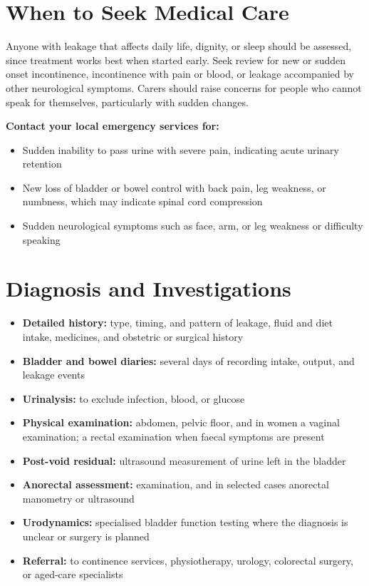 \section*{When to Seek Medical Care}
Anyone with leakage that affects daily life, dignity, or sleep should be assessed, since treatment works best when started early. Seek review for new or sudden onset incontinence, incontinence with pain or blood, or leakage accompanied by other neurological symptoms. Carers should raise concerns for people who cannot speak for themselves, particularly with sudden changes.

\textbf{Contact your local emergency services for:}
\begin{itemize}
    \item Sudden inability to pass urine with severe pain, indicating acute urinary retention
    \item New loss of bladder or bowel control with back pain, leg weakness, or numbness, which may indicate spinal cord compression
    \item Sudden neurological symptoms such as face, arm, or leg weakness or difficulty speaking
\end{itemize}

\section*{Diagnosis and Investigations}
\begin{itemize}
    \item \textbf{Detailed history:} type, timing, and pattern of leakage, fluid and diet intake, medicines, and obstetric or surgical history
    \item \textbf{Bladder and bowel diaries:} several days of recording intake, output, and leakage events
    \item \textbf{Urinalysis:} to exclude infection, blood, or glucose
    \item \textbf{Physical examination:} abdomen, pelvic floor, and in women a vaginal examination; a rectal examination when faecal symptoms are present
    \item \textbf{Post-void residual:} ultrasound measurement of urine left in the bladder
    \item \textbf{Anorectal assessment:} examination, and in selected cases anorectal manometry or ultrasound
    \item \textbf{Urodynamics:} specialised bladder function testing where the diagnosis is unclear or surgery is planned
    \item \textbf{Referral:} to continence services, physiotherapy, urology, colorectal surgery, or aged-care specialists
\end{itemize}

